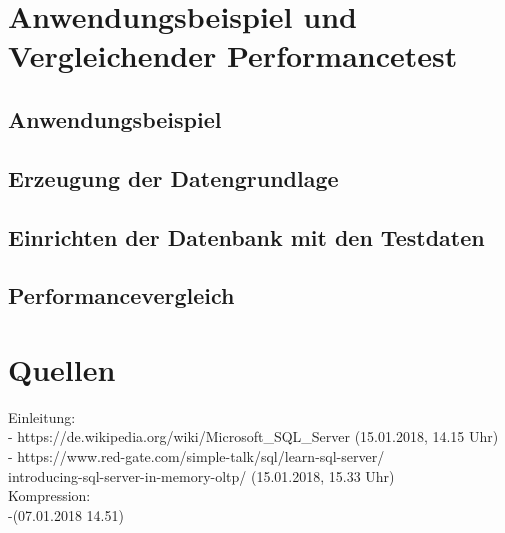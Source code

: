 \documentclass[a4paper, 12pt]{scrartcl}
\begin{document}
\newpage
\section{Anwendungsbeispiel und Vergleichender Performancetest}
\subsection{Anwendungsbeispiel}
\subsection{Erzeugung der Datengrundlage}
\subsection{Einrichten der Datenbank mit den Testdaten}
\subsection{Performancevergleich}

\newpage

\section{Quellen}
Einleitung: \\
	- https://de.wikipedia.org/wiki/Microsoft_SQL_Server (15.01.2018, 14.15 Uhr) \\
	- https://www.red-gate.com/simple-talk/sql/learn-sql-server/\\introducing-sql-server-in-memory-oltp/ (15.01.2018, 15.33 Uhr) \\
Kompression: \\
	-(07.01.2018 14.51) 	
	
\end{document}

